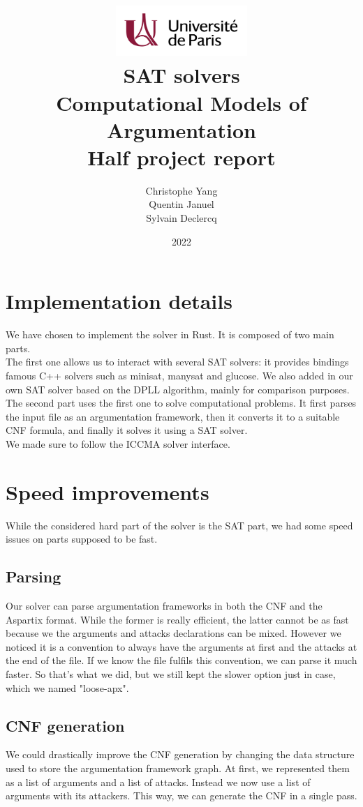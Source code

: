 \documentclass[11pt]{article}
\title{
	\centering
	\includegraphics[width=5cm]{univ-logo} \\
	\vspace{5cm}
	\textbf{SAT solvers} \\
	Computational Models of Argumentation \\
	Half project report
	\vspace{5cm}
}
\author{
    Christophe Yang \\
    Quentin Januel \\
    Sylvain Declercq
}
\date{2022}
\begin{document}
\maketitle
\newpage

\section{Implementation details}
We have chosen to implement the solver in Rust. It is composed of two main parts. \\
The first one allows us to interact with several SAT solvers: it provides bindings famous C++ solvers such as minisat, manysat and glucose. We also added in our own SAT solver based on the DPLL algorithm, mainly for comparison purposes. \\
The second part uses the first one to solve computational problems. It first parses the input file as an argumentation framework, then it converts it to a suitable CNF formula, and finally it solves it using a SAT solver. \\
We made sure to follow the ICCMA solver interface\cite{iccma}.

\section{Speed improvements}
While the considered hard part of the solver is the SAT part, we had some speed issues on parts supposed to be fast.
\subsection{Parsing}
Our solver can parse argumentation frameworks in both the CNF and the Aspartix format. While the former is really efficient, the latter cannot be as fast because we the arguments and attacks declarations can be mixed. However we noticed it is a convention to always have the arguments at first and the attacks at the end of the file. If we know the file fulfils this convention, we can parse it much faster. So that's what we did, but we still kept the slower option just in case, which we named "loose-apx".
\subsection{CNF generation}
We could drastically improve the CNF generation by changing the data structure used to store the argumentation framework graph. At first, we represented them as a list of arguments and a list of attacks. Instead we now use a list of arguments with its attackers. This way, we can generate the CNF in a single pass.
\end{document}
